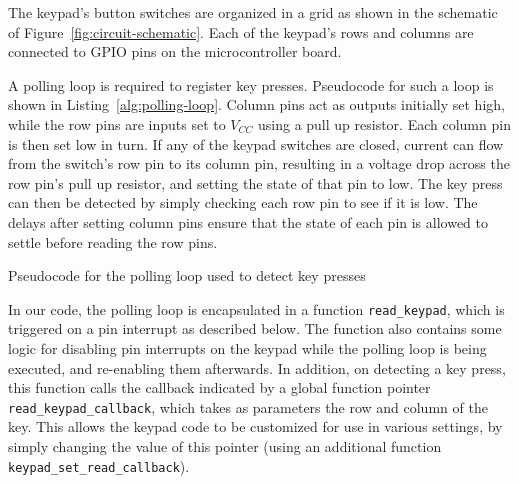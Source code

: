 \documentclass[11pt,a4paper,twocolumn]{scrartcl}
\begin{document}
The keypad's button switches are organized in a grid as shown in the schematic of Figure~\ref{fig:circuit-schematic}. Each of the keypad's rows and columns are connected to GPIO pins on the microcontroller board.

A polling loop is required to register key presses. Pseudocode for such a loop is shown in Listing~\ref{alg:polling-loop}. Column pins act as outputs initially set high, while the row pins are inputs set to $V_{CC}$ using a pull up resistor. Each column pin is then set low in turn. If any of the keypad switches are closed, current can flow from the switch's row pin to its column pin, resulting in a voltage drop across the row pin's pull up resistor, and setting the state of that pin to low. The key press can then be detected by simply checking each row pin to see if it is low. The delays after setting column pins ensure that the state of each pin is allowed to settle before reading the row pins.

\begin{algorithm}
   \caption{Pseudocode for the polling loop used to detect key presses}\label{alg:polling-loop}
\end{algorithm}

In our code, the polling loop is encapsulated in a function \verb!read_keypad!, which is triggered on a pin interrupt as described below. The function also contains some logic for disabling pin interrupts on the keypad while the polling loop is being executed, and re-enabling them afterwards. In addition, on detecting a key press, this function calls the callback indicated by a global function pointer \verb!read_keypad_callback!, which takes as parameters the row and column of the key. This allows the keypad code to be customized for use in various settings, by simply changing the value of this pointer (using an additional function \verb!keypad_set_read_callback!).
\end{document}
